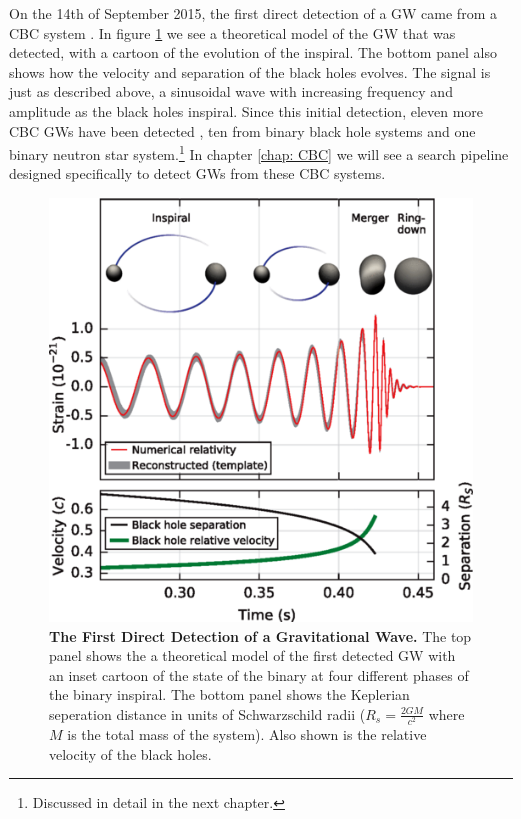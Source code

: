 \documentclass[11pt]{cuthesis}
\begin{document}
On the 14th of September 2015, the first direct detection of a GW came from a CBC system \cite{150914-det-paper}. In figure \ref{fig:150914 signal} we see a theoretical model of the GW that was detected, with a cartoon of the evolution of the inspiral. The bottom panel also shows how the velocity and separation of the black holes evolves. The signal is just as described above, a sinusoidal wave with increasing frequency and amplitude as the black holes inspiral.  Since this initial detection, eleven more CBC GWs have been detected \cite{catalog}, ten from binary black hole systems and one binary neutron star system.\footnote{Discussed in detail in the next chapter.} In chapter \ref{chap: CBC} we will see a search pipeline designed specifically to detect GWs from these CBC systems. 

\begin{figure}[ht]
\centering
\includegraphics[width=12cm]{150914signal.png} 
\caption{\textbf{The First Direct Detection of a Gravitational Wave.} The top panel shows the a theoretical model of the first detected GW with an inset cartoon of the state of the binary at four different phases of the binary inspiral. The bottom panel shows the Keplerian seperation distance in units of Schwarzschild radii ($R_s=\frac{2GM}{c^2}$ where $M$ is the total mass of the system). Also shown is the relative velocity of the black holes.  \cite{150914-det-paper} }
\label{fig:150914 signal}
\end{figure}
\end{document}
